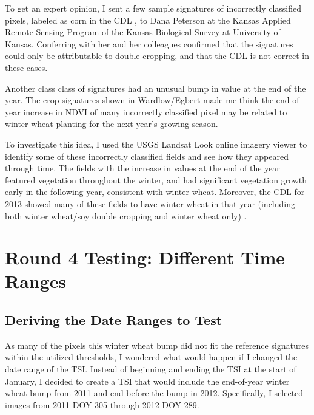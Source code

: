 To get an expert opinion, I sent a few sample signatures of incorrectly classified pixels, labeled as corn in the CDL , to Dana Peterson at the Kansas Applied Remote Sensing Program of the Kansas Biological Survey at University of Kansas. Conferring with her and her colleagues confirmed that the signatures could only be attributable to double cropping, and that the CDL is not correct in these cases. 

Another class class of signatures had an unusual bump in value at the end of the year. The crop signatures shown in Wardlow/Egbert made me think the end-of-year increase in NDVI of many incorrectly classified pixel may be related to winter wheat planting for the next year’s growing season.

To investigate this idea, I used the USGS Landsat Look online imagery viewer to identify some of these incorrectly classified fields and see how they appeared through time. The fields with the increase in values at the end of the year featured vegetation throughout the winter, and had significant vegetation growth early in the following year, consistent with winter wheat. Moreover, the CDL for 2013 showed many of these fields to have winter wheat in that year (including both winter wheat/soy double cropping and winter wheat only) .

\section{Round 4 Testing: Different Time Ranges}
\label{appendix:testing:r4}

\subsection*{Deriving the Date Ranges to Test}

As many of the pixels this winter wheat bump did not fit the reference signatures within the utilized thresholds, I wondered what would happen if I changed the date range of the TSI. Instead of beginning and ending the TSI at the start of January, I decided to create a TSI that would include the end-of-year winter wheat bump from 2011 and end before the bump in 2012. Specifically, I selected images from 2011 DOY 305 through 2012 DOY 289.


